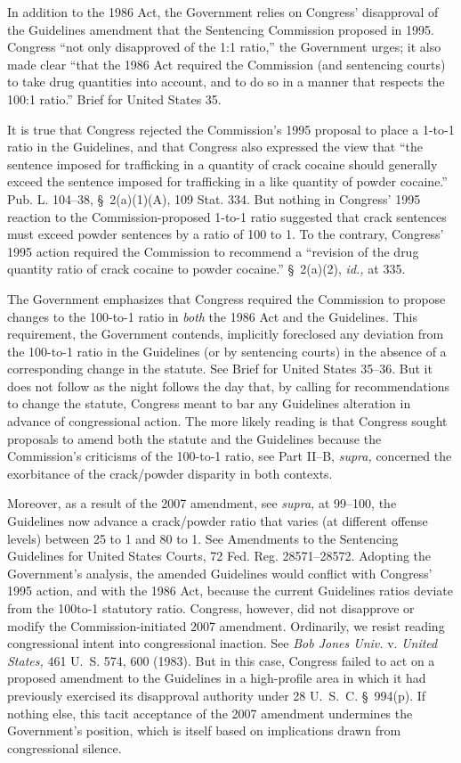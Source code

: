 {{  In addition to the 1986 Act, the Government relies on Congress'
disapproval of the Guidelines amendment that the Sentencing Commission
proposed in 1995. Congress ``not only disapproved of the 1:1 ratio,''
the Government urges; it also made clear ``that the 1986 Act required
the Commission (and sentencing courts) to take drug quantities into
account, and to do so in a manner that respects the 100:1 ratio.''
Brief for United States 35.

  It is true that Congress rejected the Commission's 1995 proposal
to place a 1-to-1 ratio in the Guidelines, and that Congress also
expressed the view that ``the sentence imposed for trafficking in a
quantity of crack cocaine should generally exceed the sentence imposed
for trafficking in a like quantity of powder cocaine.'' Pub. L.
104--38, \S~2(a)(1)(A), 109 Stat. 334. But nothing in Congress'
1995 reaction to the Commission-proposed 1-to-1 ratio suggested that
crack sentences must exceed powder sentences by a ratio of 100 to 1.
To the contrary, Congress' 1995 action required the Commission to
recommend a ``revision of the drug quantity ratio of crack cocaine to
powder cocaine.'' \S~2(a)(2), \emph{id.,} at 335.

  The Government emphasizes that Congress required the Commission to
propose changes to the 100-to-1 ratio in \emph{both} \newpage  the 1986
Act and the Guidelines. This requirement, the Government contends,
implicitly foreclosed any deviation from the 100-to-1 ratio in the
Guidelines (or by sentencing courts) in the absence of a corresponding
change in the statute. See Brief for United States 35--36. But
it does not follow as the night follows the day that, by calling for
recommendations to change the statute, Congress meant to bar any
Guidelines alteration in advance of congressional action. The more
likely reading is that Congress sought proposals to amend both the
statute and the Guidelines because the Commission's criticisms of
the 100-to-1 ratio, see Part II--B, \emph{supra,} concerned the
exorbitance of the crack/powder disparity in both contexts.

  Moreover, as a result of the 2007 amendment, see \emph{supra,} at
99--100, the Guidelines now advance a crack/powder ratio that varies
(at different offense levels) between 25 to 1 and 80 to 1. See
Amendments to the Sentencing Guidelines for United States Courts, 72
Fed. Reg. 28571--28572. Adopting the Government's analysis, the
amended Guidelines would conflict with Congress' 1995 action, and
with the 1986 Act, because the current Guidelines ratios deviate from
the 100to-1 statutory ratio. Congress, however, did not disapprove or
modify the Commission-initiated 2007 amendment. Ordinarily, we resist
reading congressional intent into congressional inaction. See \emph{Bob
Jones Univ.} v. \emph{United States,} 461 U.~S. 574, 600 (1983). But
in this case, Congress failed to act on a proposed amendment to the
Guidelines in a high-profile area in which it had previously exercised
its disapproval authority under 28 U.~S.~C. \S~994(p). If nothing
else, this tacit acceptance of the 2007 amendment undermines the
Government's position, which is itself based on implications drawn
from congressional silence.

}}
